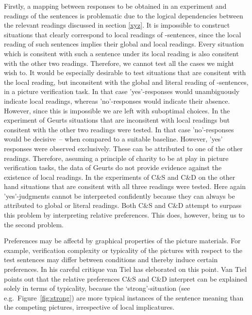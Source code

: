 \documentclass[fleqn,reqno,10pt,draft]{article}
\newcommand{\as}{\acro{as}}
\begin{document}
Firstly, a mapping between responses to be obtained in an experiment
and readings of the sentences is problematic due to the logical
dependencies between the relevant readings discussed in section
\ref{xyz}. It is impossible to construct situations that clearly
correspond to local readings of \as-sentences, since the local reading
of such sentences implies their global and local readings. Every
situation which is consitent with such a sentence under its local
reading is also consitent with the other two readings. Therefore, we
cannot test all the cases we might wish to. It would be especially
desirable to test situations that are consitent with the local
reading, but inconsitent with the global and literal reading of
\as-sentences, in a picture verification task. In that case
'yes'-responses would unambiguously indicate local readings, whereas
'no'-responses would indicate their absence. However, since this is
impossible we are left with suboptimal choices. In the experiment of
Geurts situations that are inconsitent with local readings but
consitent with the other two readings were tested. In that case
'no'-responses would be decisive~-- when compared to a suitable
baseline. However, 'yes' responses were observed exclusively. These
can be attributed to one of the other readings. Therefore, assuming a
principle of charity \citep{Davidson1973:Radical-Interpr} to be at
play in picture verification tasks, the data of Geurts do not provide
evidence against the existence of local readings.  In the experiments
of C\&S and C\&D on the other hand situations that are consitent with
all three readings were tested. Here again 'yes'-judgments cannot be
interpreted confidently because they can always be attributed to
global or literal readings. Both C\&S and C\&D attempt to surpass this
problem by interpreting relative preferences. This does, however,
bring us to the second problem.

Preferences may be affectd by graphical properties of the picture
materials. For example, verification complexity or typicality of the
pictures with respect to the test sentences may differ between
conditions and thereby induce certain preferences. In his careful
critique van Tiel has eleborated on this point. Van Tiel points out
that the relative preferences C\&S and C\&D interpret can be explained
solely in terms of typicality, because the `strong'-situation (see
e.g.~Figure~\ref{fig:strong}) are more typical instances of the
sentence meaning than the competing pictures, irrespective of local
implicatures.
\end{document}

